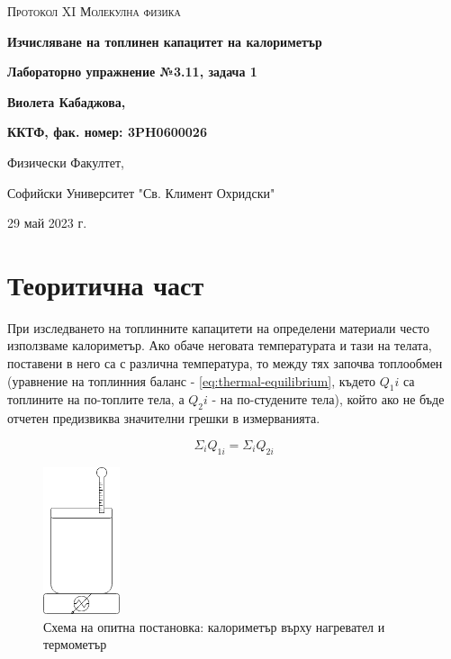 \documentclass[12pt]{article}
\begin{document}
\begin{titlepage}
	\flushleft
	{\scshape\Large Протокол XI \hspace{2cm} Молекулна физика\par}
	\vspace{4cm}
	{\huge\bfseries Изчисляване на топлинен капацитет на калориметър\par}
	\vspace{1cm}
	{\LARGE\bfseries Лабораторно упражнение №3.11, задача 1\par}
	\vspace{5cm}
    {\LARGE\bfseries Виолета Кабаджова, \par}
    {\large\bfseries ККТФ, фак. номер: 3PH0600026\par}
	\vspace{1cm}
	
	{\large Физически Факултет, 
	
	Софийски Университет "Св. Климент Охридски"
	
	29 май 2023 г.\par}
	
\end{titlepage}

\section{Теоритична част}\label{sec:theoretical-part}
При изследването на топлинните капацитети на определени материали често използваме калориметър. Ако обаче неговата температурата и тази на телата, поставени в него са с различна температура, то между тях започва топлообмен (уравнение на топлинния баланс - \ref{eq:thermal-equilibrium}, където $Q_1i$ са топлините на по-топлите тела, а $Q_2i$ - на по-студените тела), който ако не бъде отчетен предизвиква значителни грешки в измерванията.

\begin{equation}\label{eq:thermal-equilibrium}
    \Sigma_i Q_{1i} = \Sigma_i Q_{2i}
\end{equation}

\begin{figure}
    \centering
    \includegraphics[width=0.2\textwidth]{images/setup-caloriemeter.drawio.png}
    \caption{\label{fig:setup}Схема на опитна постановка: калориметър върху нагревател и термометър}
    \label{fig:setup}
\end{figure}
\end{document}
